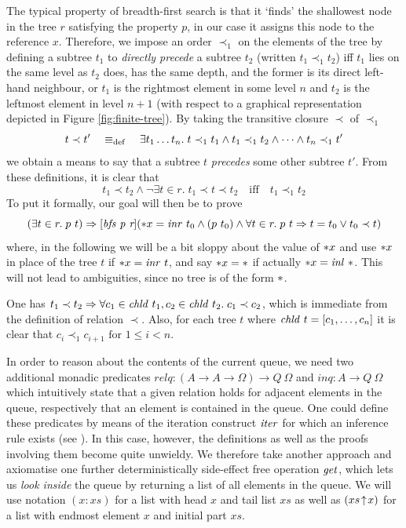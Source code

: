 The typical property of breadth-first search is that it `finds' the shallowest
node in the tree $r$ satisfying the property $p$, \IE in our case it assigns
this node to the reference $x$. Therefore, we impose an order $\prec_1$ on the
elements of the tree by defining a subtree $t_1$ to \emph{directly precede} a
subtree $t_2$ (written $t_1 \prec_1 t_2$) iff $t_1$ lies on the same level as $t_2$
does, \IE has the same depth, and the former is its direct left-hand neighbour,
or $t_1$ is the rightmost element in some level $n$ and $t_2$ is the leftmost
element in level $n+1$ (with respect to a graphical representation depicted in
Figure \ref{fig:finite-tree}). By taking the transitive closure $\prec$ of $\prec_1$
\[
t \prec t' \quad\equiv_{\mathrm{def}}\quad \exists t_1\ldots t_n.\; t \prec_1 t_1 \land t_1 \prec_1 t_2 \land \cdots \land  t_n \prec_1 t'
\]
we obtain a means to say that a subtree $t$ \emph{precedes} some other subtree
$t'$. From these definitions, it is clear that 
\[t_1 \prec t_2 \land \lnot \exists t \in r.\; t_1\prec t\prec t_2 \quad\text{iff}\quad t_1 \prec_1 t_2\]
To put it formally, our goal will then be  to prove
\[
  (\exists t \in r.\; p\ t) \Rightarrow [\mbox{\itshape bfs p r}]({\ast x} = \mathit{inr}~t_0 \land (p\ t_0) \land \forall t \in r.\; p\ t \Rightarrow t = t_0 \lor t_0 \prec t)
\]
where, in the following we will be a bit sloppy about the value of ${\ast x}$ and
use ${\ast x}$ in place of the tree $t$ if ${\ast x} = \mathit{inr}~t$, and say ${\ast x} =
\ast$ if actually ${\ast x} = \mathit{inl}~\ast$. This will not lead to ambiguities,
since no tree is of the form $\ast$.
\begin{rem}
\label{rem-chld}
One has $t_1 \prec t_2 \Rightarrow \forall c_1\in\mathit{chld}~t_1, c_2 \in \mathit{chld}~t_2.\; c_1 \prec
c_2$, which is immediate from the definition of relation $\prec$. Also, for 
each tree $t$ where $\mathit{chld}~t = [c_1,\ldots, c_n]$ it is clear that
$c_i \prec_{1} c_{i+1} \text{ for } 1\leq i<n$.
\end{rem}

In order to reason about the contents of the current queue, we need two
additional monadic predicates $relq : (A \to A \to \Omega) \to Q\ \Omega$ and $inq : A \to Q\ \Omega $
which intuitively state that a given relation holds for adjacent elements in the
queue, respectively that an element is contained in the queue. One could define
these predicates by means of the iteration construct $\mathit{iter}$ for which an
inference rule exists (see \cite{SchroederMossakowski:PDL}). In this case,
however, the definitions as well as the proofs involving them become quite
unwieldy. We therefore take another approach and axiomatise one further
deterministically side-effect free operation $\mathit{get}$, which lets us
\emph{look inside} the queue by returning a list of all elements in the queue.
We will use notation $(x:xs)$ for a list with head $x$ and tail list $xs$ as
well as $(xs\!\uparrow\! x)$ for a list with endmost element $x$ and initial part $xs$.

